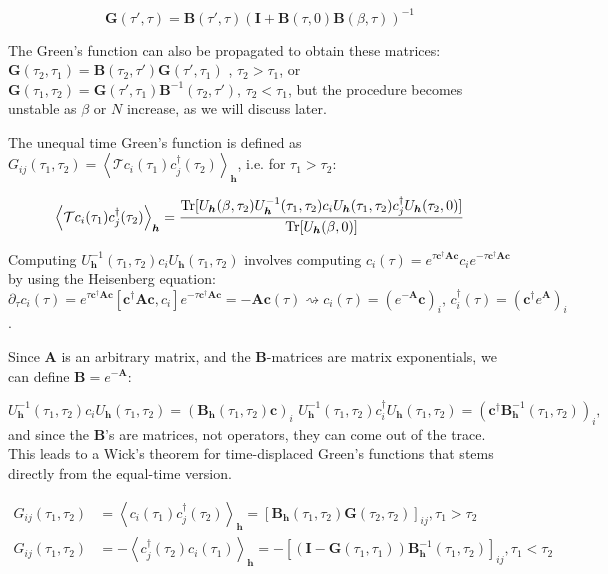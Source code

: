 \begin{equation}
\bm G ( \tau' , \tau ) = \bm B ( \tau', \tau ) ( \bm I + \bm B ( \tau, 0 ) \bm B ( \beta, \tau ) )^{-1}
\end{equation}

The Green's function can also be propagated to obtain these matrices: $\bm G ( \tau_2, \tau_1) = \bm B ( \tau_2, \tau') \bm G ( \tau', \tau_1)$ , $\tau_2 > \tau_1$, or $\bm G ( \tau_1, \tau_2) =  \bm G ( \tau', \tau_1) \bm B^{-1} ( \tau_2, \tau') , \, \tau_2 < \tau_1$, but the procedure becomes unstable as $\beta$ or $N$ increase, as we will discuss later.

The unequal time Green's function is defined as 
$
G_{ij} ( \tau_1, \tau_2 ) = \left\langle \mathcal{T} c_i ( \tau_1 ) c_j^\dagger ( \tau_2 ) \right\rangle_{\bm h}
$, 
i.e. for $\tau_1 > \tau_2$:

\begin{equation}
\left\langle \mathcal{T} c_i ( \tau_1 ) c_j^\dagger ( \tau_2 ) \right\rangle_{\bm h} = \frac{\operatorname{Tr} [ U_{\bm h} (\beta, \tau_2 ) U_{\bm h}^{-1} (\tau_1, \tau_2) c_i U_{\bm h} (\tau_1, \tau_2 ) c_j^\dagger U_{\bm h} (\tau_2, 0) ]}{\operatorname{Tr}[ U_{\bm h}(\beta, 0) ]}
\end{equation}

Computing $U_{\bm h}^{-1} (\tau_1, \tau_2) c_i U_{\bm h} (\tau_1, \tau_2 )$ involves computing $c_i ( \tau ) = e^{\tau \bm c^\dagger \bm A \bm c} c_i e^{-\tau \bm c^\dagger \bm A \bm c}$ by using the Heisenberg equation:
$
\partial_\tau c_i ( \tau ) = e^{\tau \bm c^\dagger \bm A \bm c} [ \bm c^\dagger \bm A \bm c, c_i ] e^{-\tau \bm c^\dagger \bm A \bm c} = - \bm A \bm c ( \tau ) \rightsquigarrow c_i (\tau ) = ( e^{-\bm A} \bm c )_i , \, c_i ^\dagger(\tau ) = ( \bm c^\dagger e^{\bm A}  )_i 
$.

Since $\bm A$ is an arbitrary matrix, and the $\bm B$-matrices are matrix exponentials, we can define $\bm B = e^{-\bm A}$:

\begin{equation}
U_{\bm h}^{-1} (\tau_1, \tau_2) c_i U_{\bm h} (\tau_1, \tau_2 ) = ( \bm B_{\bm h} ( \tau_1 , \tau_2 ) \bm c )_i \,\,
U_{\bm h}^{-1} (\tau_1, \tau_2) c_i^\dagger U_{\bm h} (\tau_1, \tau_2 ) = ( \bm c^\dagger \bm B_{\bm h}^{-1} ( \tau_1 , \tau_2 )  )_i ,
\end{equation}
and since the $\bm B$'s are matrices, not operators, they can come out of the trace.
This leads to a Wick's theorem for time-displaced Green's functions that stems directly from the equal-time version.

\begin{equation}
\begin{split}
G_{ij} ( \tau_1 , \tau_2 ) &= \left\langle  c_i ( \tau_1 ) c_j^\dagger ( \tau_2 ) \right\rangle_{\bm h} = [ \bm B_{\bm h} (\tau_1, \tau_2 ) \bm G (\tau_2, \tau_2 ) ]_{ij} , \tau_1 > \tau_2 \\
G_{ij} ( \tau_1 , \tau_2 ) &= -\left\langle  c_j^\dagger ( \tau_2 ) c_i ( \tau_1 )  \right\rangle_{\bm h} = - [ ( \bm I - \bm G (\tau_1, \tau_1 ) ) \bm B_{\bm h}^{-1} (\tau_1, \tau_2 ) ]_{ij} , \tau_1 < \tau_2
\end{split}
\end{equation}